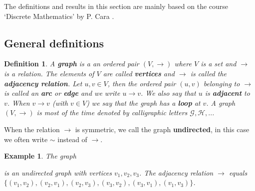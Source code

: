 \documentclass[a4paper,11pt]{report}
\newtheorem{example}[theorem]{Example}
\newtheorem{definition}[theorem]{Definition}
\begin{document}
The definitions and results in this section are mainly based on the course 
`Discrete Mathematics' by P. Cara \cite{cara}. 


\subsection{General definitions}
\begin{definition}\label{defgraf}
  A \textbf{graph} is a an ordered pair $(V,\rightarrow)$ where $V$ is a set and $\to$ is a relation. The elements of $V$ are called
 \textbf{vertices} and $\rightarrow$ is called the \textbf{adjacency relation}. Let $u, v \in V$, then the ordered pair 
 $(u, v)$ belonging to $\to$ is called an \textbf{arc} or \textbf{edge} and we write $u \rightarrow v$. We also
 say that $u$ is \textbf{adjacent} to $v$.  When $v \to v$ (with $v \in V$) we say that the graph has a 
 \textbf{loop} at $v$. A graph $(V,\rightarrow)$ is 
  most of the time denoted by calligraphic letters $\mathscr{G}, 
  \mathscr{H},..$.   \end{definition}
 When the relation $\rightarrow$ is symmetric, 
 we call the graph \textbf{undirected}, in this case we often write $\sim$ instead 
 of $\rightarrow$.  
 
 
 \begin{example}\label{simpelegraf}
  The graph
  \begin{center}

\end{center}
is an undirected graph with vertices $v_1, v_2, v_3$. The adjacency 
relation $\to$ equals \\$\{(v_1,v_2), (v_2,v_1), (v_2, v_3), (v_3,v_2), (v_3, v_1), 
(v_1,v_3)\}$.
\end{example}
\end{document}
